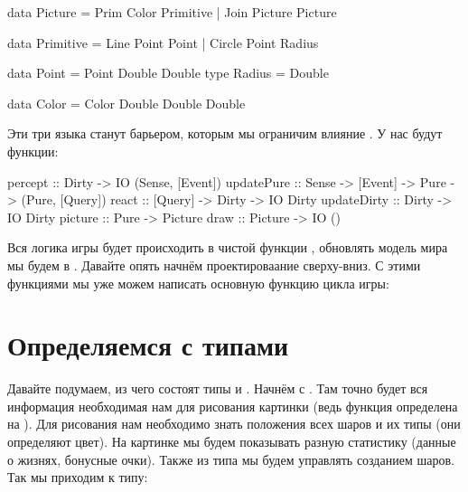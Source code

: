 \begin{code}
data Picture = Prim Color Primitive
             | Join Picture Picture

data Primitive = Line Point Point | Circle Point Radius

data Point  = Point Double Double
type Radius = Double   

data Color = Color Double Double Double
\end{code}

Эти три языка станут барьером, которым мы ограничим
влияние . У нас будут функции:

\begin{code}
percept     :: Dirty -> IO (Sense, [Event])
updatePure  :: Sense -> [Event] -> Pure -> (Pure, [Query])
react       :: [Query] -> Dirty -> IO Dirty
updateDirty :: Dirty -> IO Dirty
picture     :: Pure -> Picture
draw        :: Picture -> IO ()
\end{code}

Вся логика игры будет происходить в чистой функции 
, обновлять модель мира мы будем в . 
Давайте опять начнём проектироваание сверху-вниз. 
С этими функциями мы уже можем написать основную функцию
цикла игры:


\section{Определяемся с типами}

Давайте подумаем, из чего состоят типы  и .
Начнём с . Там точно будет вся информация необходимая
нам для рисования картинки (ведь функция  
определена на ). Для рисования нам необходимо знать
положения всех шаров и их типы (они определяют цвет). 
На картинке мы будем показывать разную статистику 
(данные о жизнях, бонусные очки). Также из типа 
мы будем управлять созданием шаров. Так мы приходим к типу:

